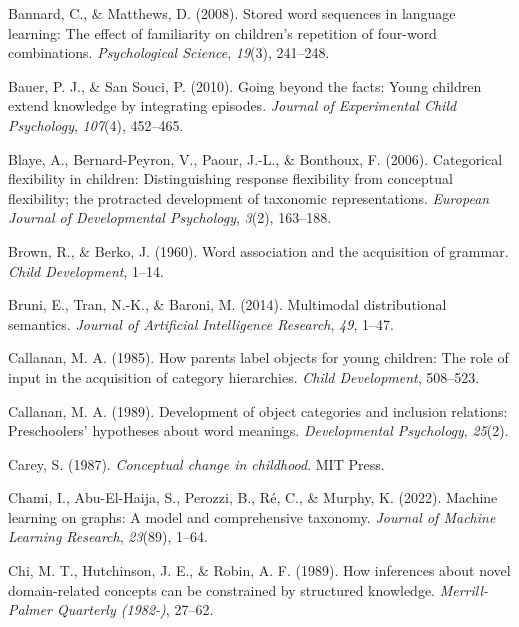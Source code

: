 \documentclass[english,,man]{apa6}
\begin{document}
\leavevmode\hypertarget{ref-bannard2008}{}%
Bannard, C., \& Matthews, D. (2008). Stored word sequences in language learning: The effect of familiarity on children's repetition of four-word combinations. \emph{Psychological Science}, \emph{19}(3), 241--248.

\leavevmode\hypertarget{ref-bauer2010going}{}%
Bauer, P. J., \& San Souci, P. (2010). Going beyond the facts: Young children extend knowledge by integrating episodes. \emph{Journal of Experimental Child Psychology}, \emph{107}(4), 452--465.

\leavevmode\hypertarget{ref-blaye2006categorical}{}%
Blaye, A., Bernard-Peyron, V., Paour, J.-L., \& Bonthoux, F. (2006). Categorical flexibility in children: Distinguishing response flexibility from conceptual flexibility; the protracted development of taxonomic representations. \emph{European Journal of Developmental Psychology}, \emph{3}(2), 163--188.

\leavevmode\hypertarget{ref-brown1960word}{}%
Brown, R., \& Berko, J. (1960). Word association and the acquisition of grammar. \emph{Child Development}, 1--14.

\leavevmode\hypertarget{ref-bruni2014}{}%
Bruni, E., Tran, N.-K., \& Baroni, M. (2014). Multimodal distributional semantics. \emph{Journal of Artificial Intelligence Research}, \emph{49}, 1--47.

\leavevmode\hypertarget{ref-callanan1985}{}%
Callanan, M. A. (1985). How parents label objects for young children: The role of input in the acquisition of category hierarchies. \emph{Child Development}, 508--523.

\leavevmode\hypertarget{ref-callanan1989}{}%
Callanan, M. A. (1989). Development of object categories and inclusion relations: Preschoolers' hypotheses about word meanings. \emph{Developmental Psychology}, \emph{25}(2).

\leavevmode\hypertarget{ref-carey1987}{}%
Carey, S. (1987). \emph{Conceptual change in childhood}. MIT Press.

\leavevmode\hypertarget{ref-chami2022machine}{}%
Chami, I., Abu-El-Haija, S., Perozzi, B., Ré, C., \& Murphy, K. (2022). Machine learning on graphs: A model and comprehensive taxonomy. \emph{Journal of Machine Learning Research}, \emph{23}(89), 1--64.

\leavevmode\hypertarget{ref-chi1989}{}%
Chi, M. T., Hutchinson, J. E., \& Robin, A. F. (1989). How inferences about novel domain-related concepts can be constrained by structured knowledge. \emph{Merrill-Palmer Quarterly (1982-)}, 27--62.
\end{document}
